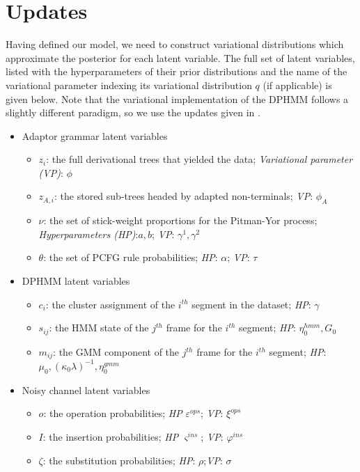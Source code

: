 \documentclass[12pt,letterpaper]{article}
\begin{document}
\section{Updates}
Having defined our model, we need to construct variational distributions which approximate the posterior for each latent variable. The full set of latent variables, listed with the hyperparameters of their prior distributions and the name of the variational parameter indexing its variational distribution $q$ (if applicable) is given below. Note that the variational implementation of the DPHMM follows a slightly different paradigm, so we use the updates given in \citet{ondel:2016}. 
\begin{itemize}
    \item Adaptor grammar latent variables
    \begin{itemize}
        \item $z_i$: the full derivational trees that yielded the data; \textit{Variational parameter (VP)}: $\phi $
        \item $z_{A,i}$: the stored sub-trees headed by adapted non-terminals; \textit{VP}: $\phi_A$
        \item $\nu$: the set of stick-weight proportions for the Pitman-Yor process; 
        \textit{Hyperparameters (HP)}:$a,b$; \textit{VP}: $\gamma^1, \gamma^2$
        \item $\theta$: the set of PCFG rule probabilities; \textit{HP}: $\alpha$; \textit{VP}: $\tau$ 
    \end{itemize}
    \item DPHMM latent variables
    \begin{itemize}
        \item $c_i$: the cluster assignment of the $i^{th}$ segment in the dataset; \textit{HP}: $\gamma$
        \item $s_{ij}$: the HMM state of the $j^{th}$ frame for the $i^{th}$ segment; \textit{HP}: $\eta_0^{hmm}, G_0$ 
        \item $m_{ij}$: the GMM component of the $j^{th}$ frame for the $i^{th}$ segment; \textit{HP}: $\mu_0, (\kappa_0\lambda)^{-1}, \eta_0^{gmm}$
    \end{itemize}
    \item Noisy channel latent variables
    \begin{itemize}
        \item $o$: the operation probabilities; \textit{HP} $\varepsilon^{ops}$; \textit{VP}: $\xi^{ops}$
        \item $I$: the insertion probabilities; \textit{HP} $\varsigma^{ins}$; \textit{VP}: $\varphi^{ins}$
        \item $\zeta$: the substitution probabilities; \textit{HP}: $\rho $;\textit{VP}: $\sigma$
    \end{itemize}
\end{itemize}
\end{document}

